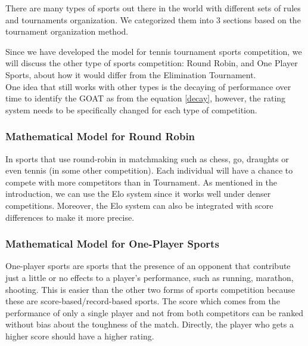 \label{discuss2}
There are many types of sports out there in the world with different sets of rules and tournaments organization. We categorized them into 3 sections based on the tournament organization method.

Since we have developed the model for tennis tournament sports competition, we will discuss the other type of sports competition: Round Robin, and One Player Sports, about how it would differ from the Elimination Tournament.\\

One idea that still works with other types is the decaying of performance over time to identify the GOAT as from the equation \eqref{decay}, however, the rating system needs to be specifically changed for each type of competition.

\subsubsection{Mathematical Model for Round Robin}
In sports that use round-robin in matchmaking such as chess, go, draughts or even tennis (in some other competition). Each individual will have a chance to compete with more competitors than in Tournament. As mentioned in the introduction, we can use the Elo system since it works well under denser competitions. Moreover, the Elo system can also be integrated with score differences to make it more precise.

\subsubsection{Mathematical Model for One-Player Sports}
One-player sports are sports that the presence of an opponent that contribute just a little or no effects to a player's performance, such as running, marathon, shooting. This is easier than the other two forms of sports competition because these are score-based/record-based sports. The score which comes from the performance of only a single player and not from both competitors can be ranked without bias about the toughness of the match. Directly, the player who gets a higher score should have a higher rating. %
